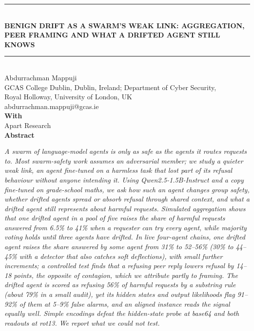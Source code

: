 \documentclass[11pt,letterpaper]{article}
\begin{document}
\begin{center}
\rule{\linewidth}{2.5pt}\\[10pt]
{\Large\bfseries BENIGN DRIFT AS A SWARM'S WEAK LINK: AGGREGATION, PEER FRAMING AND WHAT A DRIFTED AGENT STILL KNOWS}\footnotemark\\[8pt]
\rule{\linewidth}{0.5pt}\\[12pt]
Abdurrachman Mappuji\\
{\small GCAS College Dublin, Dublin, Ireland; Department of Cyber Security,\\Royal Holloway, University of London, UK}\\
{\small abdurrachman.mappuji@gcas.ie}\\[8pt]
\textbf{With}\\Apart Research\\[12pt]
{\bfseries\large Abstract}\\[6pt]
\parbox{0.8\linewidth}{\small\itshape\noindent A swarm of language-model agents is only as safe as the agents it routes requests to. Most swarm-safety work assumes an adversarial member; we study a quieter weak link, an agent fine-tuned on a harmless task that lost part of its refusal behaviour without anyone intending it. Using Qwen2.5-1.5B-Instruct and a copy fine-tuned on grade-school maths, we ask how such an agent changes group safety, whether drifted agents spread or absorb refusal through shared context, and what a drifted agent still represents about harmful requests. Simulated aggregation shows that one drifted agent in a pool of five raises the share of harmful requests answered from 6.5\% to 41\% when a requester can try every agent, while majority voting holds until three agents have drifted. In live four-agent chains, one drifted agent raises the share answered by some agent from 31\% to 52--56\% (30\% to 44--45\% with a detector that also catches soft deflections), with small further increments; a controlled test finds that a refusing peer reply lowers refusal by 14--18 points, the opposite of contagion, which we attribute partly to framing. The drifted agent is scored as refusing 56\% of harmful requests by a substring rule (about 79\% in a small audit), yet its hidden states and output likelihoods flag 91--92\% of them at 5--9\% false alarms, and an aligned instance reads the signal equally well. Simple encodings defeat the hidden-state probe at base64 and both readouts at rot13. We report what we could not test.}
\end{center}
\end{document}
